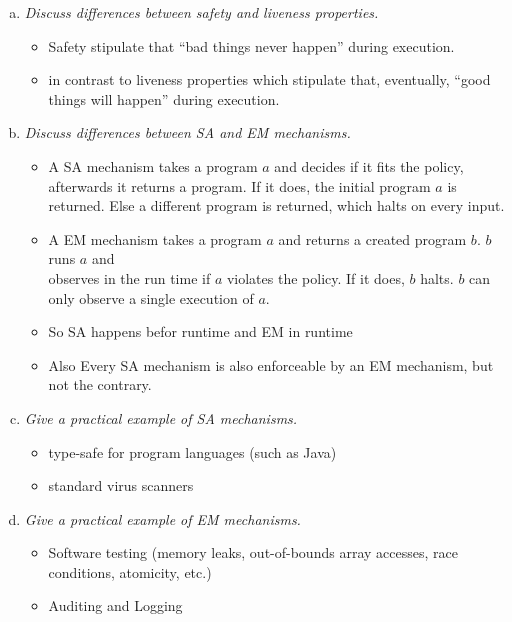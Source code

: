 \begin{enumerate}[(a)]
    \item {\itshape Discuss differences between safety and liveness properties.}
    \begin{itemize}
        \item Safety stipulate that “bad things never happen” during execution.
        \item in contrast to liveness properties which stipulate that, eventually, “good things will happen” during execution.
    \end{itemize}
     
    \item {\itshape Discuss differences between SA and EM mechanisms.}
    \begin{itemize}
        \item A SA mechanism takes a program $a$ and {decides if it fits the policy, afterwards it returns a program}. If it does, the initial program $a$ is returned. Else a different program is returned, which halts on every input.
        \item A EM mechanism takes a program $a$ and returns a created program $b$. $b$ runs $a$ and \\ {observes in the run time if $a$ violates the policy}. If it does, $b$ halts. {$b$ can only observe a single execution of $a$.}
        \item So SA happens befor runtime and EM in runtime
        \item Also Every SA mechanism is also enforceable by an EM mechanism, but not the contrary.
        
    \end{itemize}

    \item {\itshape Give a practical example of SA mechanisms.}
    \begin{itemize}
        \item type-safe for program languages (such as Java)
        \item standard virus scanners
    \end{itemize}


    \item {\itshape Give a practical example of EM mechanisms.}
    \begin{itemize}
        \item Software testing (memory leaks, out-of-bounds array accesses, race conditions, atomicity, etc.)
        \item Auditing and Logging
    \end{itemize}

    
\end{enumerate}

